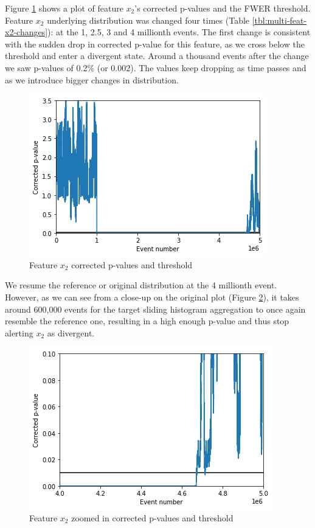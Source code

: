 Figure \ref{fig:x2-corrected-pvalues} shows a plot of feature $x_2$'s corrected p-values and the FWER threshold. Feature $x_2$ underlying distribution was changed four times (Table \ref{tbl:multi-feat-x2-changes}): at the 1, 2.5, 3 and 4 millionth events. The first change is consistent with the sudden drop in corrected p-value for this feature, as we cross below the threshold and enter a divergent state. Around a thousand events after the change we saw p-values of 0.2\% (or 0.002). The values keep dropping as time passes and as we introduce bigger changes in distribution.
\begin{figure}[!htb]
    \begin{center}
      \includegraphics[scale=0.8]{figures/x2-corrected-pvalues.png}
      \caption{Feature $x_2$ corrected p-values and threshold}
      \label{fig:x2-corrected-pvalues}
    \end{center}
\end{figure}
We resume the reference or original distribution at the 4 millionth event. However, as we can see from a close-up on the original plot (Figure \ref{fig:x2-corrected-pvalues-zoom}), it takes around 600,000 events for the target sliding histogram aggregation to once again resemble the reference one, resulting in a high enough p-value and thus stop alerting $x_2$ as divergent.
\begin{figure}[!htb]
    \begin{center}
      \includegraphics[scale=0.8]{figures/x2-corrected-pvalues-zoom2.png}
      \caption{Feature $x_2$ zoomed in corrected p-values and threshold}
      \label{fig:x2-corrected-pvalues-zoom}
    \end{center}
\end{figure}


